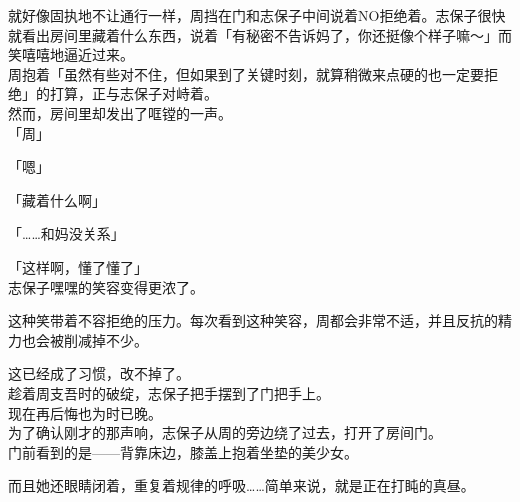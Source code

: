 就好像固执地不让通行一样，周挡在门和志保子中间说着NO拒绝着。志保子很快就看出房间里藏着什么东西，说着「有秘密不告诉妈了，你还挺像个样子嘛～」而笑嘻嘻地逼近过来。\\

周抱着「虽然有些对不住，但如果到了关键时刻，就算稍微来点硬的也一定要拒绝」的打算，正与志保子对峙着。\\

然而，房间里却发出了哐镗的一声。\\

「周」

「嗯」

「藏着什么啊」

「……和妈没关系」

「这样啊，懂了懂了」\\

志保子嘿嘿的笑容变得更浓了。

这种笑带着不容拒绝的压力。每次看到这种笑容，周都会非常不适，并且反抗的精力也会被削减掉不少。

这已经成了习惯，改不掉了。\\

趁着周支吾时的破绽，志保子把手摆到了门把手上。\\

现在再后悔也为时已晚。\\

为了确认刚才的那声响，志保子从周的旁边绕了过去，打开了房间门。\\

门前看到的是——背靠床边，膝盖上抱着坐垫的美少女。

而且她还眼睛闭着，重复着规律的呼吸……简单来说，就是正在打盹的真昼。
